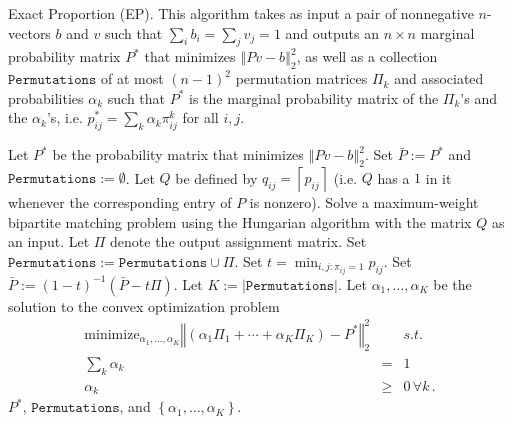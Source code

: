 \begin{algorithm}
\caption{Exact Proportion (EP). This algorithm takes as input a pair
  of nonnegative $n$-vectors $b$ and $v$ such that
  $\sum_{i}b_{i}=\sum_{j}v_{j}=1$ and outputs an $n\times n$ marginal
  probability matrix $P^{*}$ that minimizes $\left\Vert
  Pv-b\right\Vert _{2}^{2}$, as well as a collection
  $\mathtt{Permutations}$ of at most $(n-1)^{2}$ permutation matrices
  $\Pi_{k}$ and associated probabilities $\alpha_{k}$ such that
  $P^{*}$ is the marginal probability matrix of the $\Pi_{k}$'s and
  the $\alpha_{k}$'s, i.e. $p_{ij}^{*}=\sum_{k}\alpha_{k}\pi_{ij}^{k}$
  for all $i,j$.  }
\label{alg:find-equitable}
\begin{algorithmic}
\STATE Let $P^{*}$ be the probability matrix that minimizes $\left\Vert Pv-b\right\Vert _{2}^{2}$.
\STATE {}
\STATE Set $\bar{P}:=P^{*}$ and $\mathtt{Permutations}:=\emptyset$.
\STATE Let $Q$ be defined by $q_{ij}=\left\lceil p_{ij}\right\rceil $ (i.e.
$Q$ has a $1$ in it whenever the corresponding entry of $P$ is
nonzero).
\STATE Solve a maximum-weight bipartite matching problem using the Hungarian
algorithm \cite{burkard2009assignment} with the matrix $Q$ as an
input. Let $\Pi$ denote the output assignment matrix.
\STATE {}
\STATE Set $\mathtt{Permutations}:=\mathtt{Permutations}\cup\Pi$.
\STATE Set $t=\min_{i,j:\pi_{ij}=1}p_{ij}$.
\STATE Set $\bar{P}:=(1-t)^{-1}(\bar{P}-t\Pi)$.
\STATE {}
\ENDWHILE
\STATE {}
\STATE Let $K:=\left|\mathtt{Permutations}\right|$. Let $\alpha_{1},\dots,\alpha_{K}$
be the solution to the convex optimization problem\begin{eqnarray*}
\mathrm{minimize}_{\alpha_{1},\dots,\alpha_{K}}\left\Vert (\alpha_{1}\Pi_{1}+\cdots+\alpha_{K}\Pi_{K})-P^{*}\right\Vert _{2}^{2} &  & s.t.\\
\sum_{k}\alpha_{k} & = & 1\\
\alpha_{k} & \geq & 0\,\forall k\,.\end{eqnarray*}
\RETURN $P^{*}$, $\mathtt{Permutations}$, and $\left\{ \alpha_{1},\dots,\alpha_{K}\right\} $.
\end{algorithmic}
\end{algorithm}

